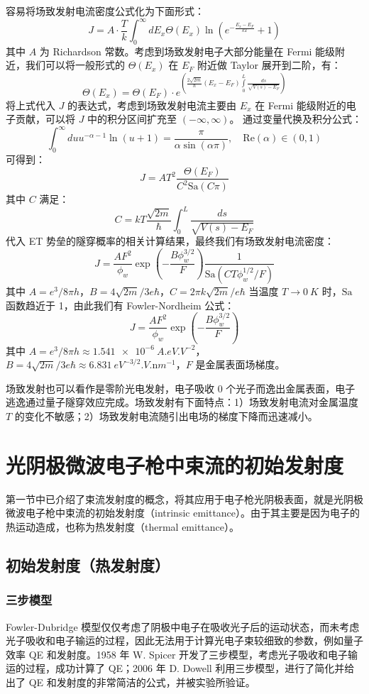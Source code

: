 	容易将场致发射电流密度公式化为下面形式：
	\[J = A\cdot\frac{T}{k}\int_0^{\infty} dE_x\Theta(E_x)\ln\left(e^{-\frac{E_x-E_F}{kT}}+1\right)\]
	其中 $A$ 为 Richardson 常数。考虑到场致发射电子大部分能量在 Fermi 能级附近，我们可以将一般形式的 $\Theta(E_x)$ 在 $E_F$ 附近做 Taylor 展开到二阶，有：
	\[\Theta(E_x)=\Theta(E_F)\cdot e^{\left(\frac{2\sqrt{2m}}{\hbar}(E_x-E_F)\int\limits_0^L\frac{ds}{\sqrt{V(s)-E_F}}\right)}\]
	将上式代入 $J$ 的表达式，考虑到场致发射电流主要由 $E_x$ 在 Fermi 能级附近的电子贡献，可以将 $J$ 中的积分区间扩充至 $(-\infty, \infty)$。
	通过变量代换及积分公式：
	\[\int_0^{\infty}du u^{-\alpha-1}\ln(u+1)=\frac{\pi}{\alpha\sin(\alpha\pi)},\quad\mathrm{Re}(\alpha)\in(0, 1)\]
	可得到：
	\[J = AT^2\frac{\Theta(E_F)}{C^2\mathrm{Sa}(C\pi)}\]
	其中 $C$ 满足：
	\[C = kT\frac{\sqrt{2m}}{\hbar}\int_0^L\frac{ds}{\sqrt{V(s)-E_F}}\]
	代入 ET 势垒的隧穿概率的相关计算结果，最终我们有场致发射电流密度：
	\begin{equation}
	J=\frac{AF^2}{\phi_w}\exp\left(-\frac{B\phi_w^{3/2}}{F}\right)\frac{1}{\mathrm{Sa}(CT\phi_w^{1/2}/F)}
	\end{equation}
	其中 $A=e^3/8\pi h$，$B=4\sqrt{2m}/3e\hbar$，$C=2\pi k\sqrt{2m}/e\hbar$
	当温度 $T\rightarrow \SI{0}{K}$ 时，$\mathrm{Sa}$ 函数趋近于 1，由此我们有 Fowler-Nordheim 公式：
	\begin{equation}
	J=\frac{AF^2}{\phi_w}\exp\left(-\frac{B\phi_w^{3/2}}{F}\right)
	\end{equation}
	其中 $A=e^3/8\pi h\approx\SI{1.541e-6}{A.eV.V^{-2}}$，$B=4\sqrt{2m}/3e\hbar\approx\SI{6.831}{eV^{-3/2}.V.\nano m^{-1}}$，$F$ 是金属表面场梯度。

场致发射也可以看作是零阶光电发射，电子吸收 0 个光子而逸出金属表面，电子逃逸通过量子隧穿效应完成。场致发射有下面特点：1）场致发射电流对金属温度 $T$ 的变化不敏感；2）场致发射电流随引出电场的梯度下降而迅速减小。

\section{光阴极微波电子枪中束流的初始发射度}
第一节中已介绍了束流发射度的概念，将其应用于电子枪光阴极表面，就是光阴极微波电子枪中束流的初始发射度（intrinsic emittance）。由于其主要是因为电子的热运动造成，也称为热发射度（thermal emittance）。

\subsection{初始发射度（热发射度）}
\subsubsection{三步模型}
Fowler-Dubridge 模型仅仅考虑了阴极中电子在吸收光子后的运动状态，而未考虑光子吸收和电子输运的过程，因此无法用于计算光电子束较细致的参数，例如量子效率 QE 和发射度。1958 年 W. Spicer 开发了三步模型，考虑光子吸收和电子输运的过程，成功计算了 QE\cite{spicer1958photoemissive}；2006 年 D. Dowell 利用三步模型，进行了简化并给出了 QE 和发射度的非常简洁的公式，并被实验所验证\cite{Dowell:2006aa}。

